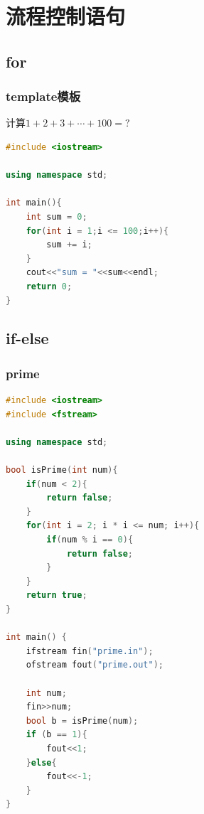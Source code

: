 \documentclass[12pt,twiside,a4paper]{ctexbook}
\numberwithin{chapter}{part}
\begin{document}
\chapter{流程控制语句}
\section{for}
\subsection{template模板}
计算$1+2+3+\cdots+100 = ?$
\begin{lstlisting}[language=C++]
#include <iostream>

using namespace std;

int main(){
	int sum = 0;
	for(int i = 1;i <= 100;i++){
		sum += i;
	}
	cout<<"sum = "<<sum<<endl;
	return 0;
}
\end{lstlisting}

\section{if-else}
\subsection{prime}
\begin{lstlisting}[language=C++]
#include <iostream>
#include <fstream>

using namespace std;

bool isPrime(int num){
	if(num < 2){
		return false;
	}
	for(int i = 2; i * i <= num; i++){
		if(num % i == 0){
			return false;
		}
	}
	return true;
}

int main() {
	ifstream fin("prime.in");
	ofstream fout("prime.out");

	int num;
	fin>>num;
	bool b = isPrime(num);
	if (b == 1){
		fout<<1;
	}else{
		fout<<-1;
	}
}
\end{lstlisting}
\end{document}
